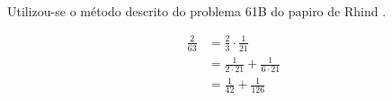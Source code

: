 
\paragraph{} Utilizou-se o método descrito do problema 61B do papiro de
Rhind \parencite[pág. 30]{Estrada2000}.

\begin{align*}
	\frac{2}{63}
	&= \frac{2}{3} \cdot \frac{1}{21} \\
	&= \frac{1}{2 \cdot 21} + \frac{1}{6 \cdot 21} \\
	&= \frac{1}{42} + \frac{1}{126}
\end{align*}

